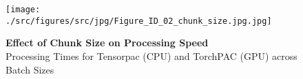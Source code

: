         \clearpage
        \begin{figure}[ht]
        	\centering
            \texttt{[image: ./src/figures/src/jpg/Figure\_ID\_02\_chunk\_size.jpg.jpg]}

\caption{\textbf{
Effect of Chunk Size on Processing Speed
}
\smallskip
\\
Processing Times for Tensorpac (CPU) and TorchPAC (GPU) across Batch Sizes
}
        	\label{fig:02_chunk_size}
        \end{figure}

